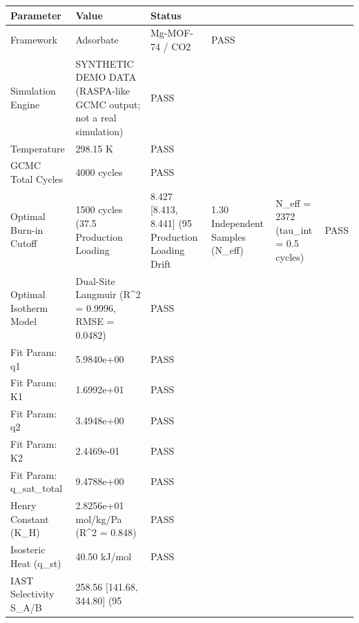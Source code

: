 \begin{tabular}{lll}
\toprule
Parameter & Value & Status \\
\midrule
Framework & Adsorbate & Mg-MOF-74 / CO2 & PASS \\
Simulation Engine & SYNTHETIC DEMO DATA (RASPA-like GCMC output; not a real simulation) & PASS \\
Temperature & 298.15 K & PASS \\
GCMC Total Cycles & 4000 cycles & PASS \\
Optimal Burn-in Cutoff & 1500 cycles (37.5%
Production Loading & 8.427 [8.413, 8.441] (95%
Production Loading Drift & 1.30%
Independent Samples (N_eff) & N_eff = 2372 (tau_int = 0.5 cycles) & PASS \\
Optimal Isotherm Model & Dual-Site Langmuir (R^2 = 0.9996, RMSE = 0.0482) & PASS \\
Fit Param: q1 & 5.9840e+00 & PASS \\
Fit Param: K1 & 1.6992e+01 & PASS \\
Fit Param: q2 & 3.4948e+00 & PASS \\
Fit Param: K2 & 2.4469e-01 & PASS \\
Fit Param: q_sat_total & 9.4788e+00 & PASS \\
Henry Constant (K_H) & 2.8256e+01 mol/kg/Pa (R^2 = 0.848) & PASS \\
Isosteric Heat (q_st) & 40.50 kJ/mol & PASS \\
IAST Selectivity S_{A/B} & 258.56 [141.68, 344.80] (95%
\bottomrule
\end{tabular}
